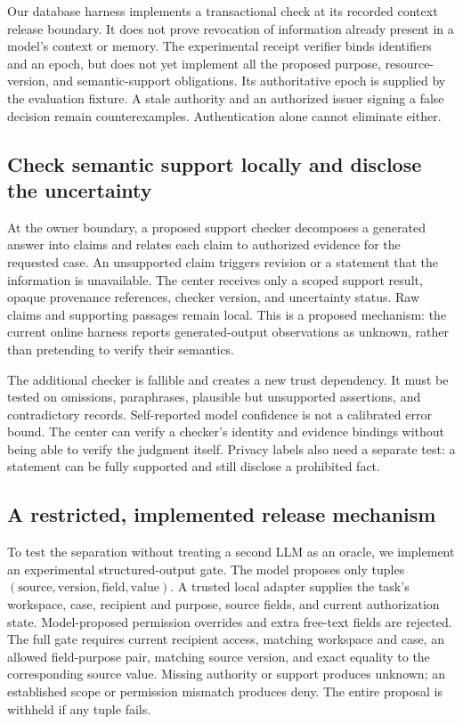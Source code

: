 Our database harness implements a transactional check at its recorded context
release boundary. It does not prove revocation of information already present in
a model's context or memory. The experimental receipt verifier binds identifiers
and an epoch, but does not yet implement all the proposed purpose, resource-version,
and semantic-support obligations. Its authoritative epoch is supplied by the
evaluation fixture. A stale authority and an authorized issuer signing a false
decision remain counterexamples. Authentication alone cannot eliminate either.

\subsection{Check semantic support locally and disclose the uncertainty}
At the owner boundary, a proposed support checker decomposes a generated answer
into claims and relates each claim to authorized evidence for the requested case.
An unsupported claim triggers revision or a statement that the information is
unavailable. The center receives only a scoped support result, opaque provenance
references, checker version, and uncertainty status. Raw claims and supporting
passages remain local. This is a proposed mechanism: the current online harness
reports generated-output observations as unknown, rather than pretending to
verify their semantics.

The additional checker is fallible and creates a new trust dependency. It must
be tested on omissions, paraphrases, plausible but unsupported assertions, and
contradictory records. Self-reported model confidence is not a calibrated error
bound. The center can verify a checker's identity and evidence bindings without
being able to verify the judgment itself. Privacy labels also need a separate
test: a statement can be fully supported and still disclose a prohibited fact.


\subsection{A restricted, implemented release mechanism}
\label{app:structured-release}
To test the separation without treating a second LLM as an oracle, we implement
an experimental structured-output gate. The model proposes only tuples
$(\mathrm{source},\mathrm{version},\mathrm{field},\mathrm{value})$. A trusted local
adapter supplies the task's workspace, case, recipient and purpose, source fields,
and current authorization state. Model-proposed permission overrides and extra
free-text fields are rejected. The full gate requires current recipient access,
matching workspace and case, an allowed field-purpose pair, matching source
version, and exact equality to the corresponding source value. Missing authority
or support produces unknown; an established scope or permission mismatch produces
deny. The entire proposal is withheld if any tuple fails.

